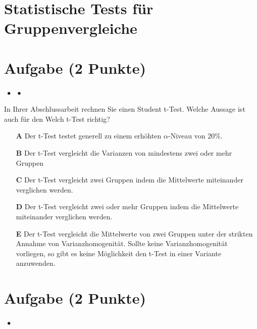 \documentclass[a4paper, 9pt]{scrartcl}\usepackage[]{graphicx}\usepackage[]{xcolor}
\begin{document}
\section*{Statistische Tests für Gruppenvergleiche} 

\section{Aufgabe \hfill (2 Punkte)}

\ifcollection
\begin{flushright}
\tiny\vspace{-2Ex}
\textbf{\examinhaltstart}
\exammodulemathstat $\;\bullet$
\exammodulestat $\;\bullet$
\exammodulestatbbv 
\vspace{-1Ex}
\end{flushright}
\fi




In Ihrer Abschlussarbeit rechnen Sie einen Student t-Test. Welche Aussage ist auch für den Welch t-Test richtig?



\begin{enumerate}
\item [\textbf{A} \msquare] Der t-Test testet generell zu einem erhöhten $\alpha$-Niveau von 20\%.
\item [\textbf{B} \msquare] Der t-Test vergleicht die Varianzen von mindestens zwei oder mehr Gruppen
\item [\textbf{C} \msquare] Der t-Test vergleicht zwei Gruppen indem die Mittelwerte miteinander verglichen werden.
\item [\textbf{D} \msquare] Der t-Test vergleicht zwei oder mehr Gruppen indem die Mittelwerte miteinander verglichen werden.
\item [\textbf{E} \msquare] Der t-Test vergleicht die Mittelwerte von zwei Gruppen unter der strikten Annahme von Varianzhomogenität. Sollte keine Varianzhomogenität vorliegen, so gibt es keine Möglichkeit den t-Test in einer Variante anzuwenden.
\end{enumerate}

\section{Aufgabe \hfill (2 Punkte)}

\ifcollection
\begin{flushright}
\tiny\vspace{-2Ex}
\textbf{\examinhaltstart}
\exammodulestatversuch $\;\bullet$
\exammodulebiostat
\vspace{-1Ex}
\end{flushright}
\fi
\end{document}
